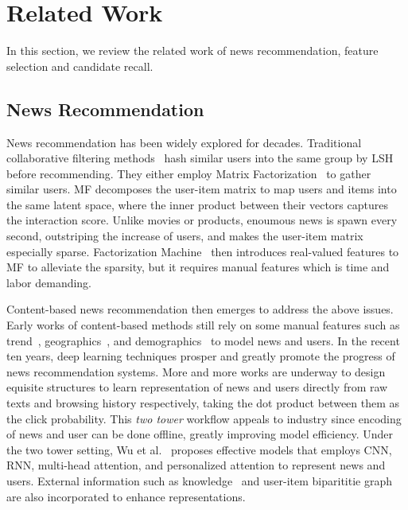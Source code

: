 \documentclass[sigconf,anonymous]{acmart}
\begin{document}
\section{Related Work}
\label{section:related work}
In this section, we review the related work of news recommendation, feature selection and candidate recall.
\subsection{News Recommendation}
News recommendation has been widely explored for decades. Traditional collaborative filtering methods~\cite{das_CF, li_SCENE} hash similar users into the same group by LSH before recommending. They either employ Matrix Factorization~\cite{koren_MF} to gather similar users. MF decomposes the user-item matrix to map users and items into the same latent space, where the inner product between their vectors captures the interaction score. Unlike movies or products, enoumous news is spawn every second, outstriping the increase of users, and makes the user-item matrix especially sparse. Factorization Machine~\cite{rendle_FM} then introduces real-valued features to MF to alleviate the sparsity, but it requires manual features which is time and labor demanding.

Content-based news recommendation then emerges to address the above issues. Early works of content-based methods still rely on some manual features such as trend~\cite{liu_bayesian_news_trend}, geographics~\cite{li_contextual_bandit}, and demographics~\cite{cheng_Wide&Deep} to model news and users. In the recent ten years, deep learning techniques prosper and greatly promote the progress of news recommendation systems. More and more works are underway to design equisite structures to learn representation of news and users directly from raw texts and browsing history respectively, taking the dot product between them as the click probability. This \emph{two tower} workflow appeals to industry since encoding of news and user can be done offline, greatly improving model efficiency. Under the two tower setting, Wu et al.~\cite{wu_GNN,wu_heterogeneous,wu_LSTUR,wu_NAML,wu_NPA,wu_NRMS,wu_topic-aware} proposes effective models that employs CNN, RNN, multi-head attention, and personalized attention to represent news and users. External information such as knowledge~\cite{wang_DKN} and user-item biparititie graph~\cite{wu_GNN,hu_GNN_disentanglement} are also incorporated to enhance representations.
\end{document}
